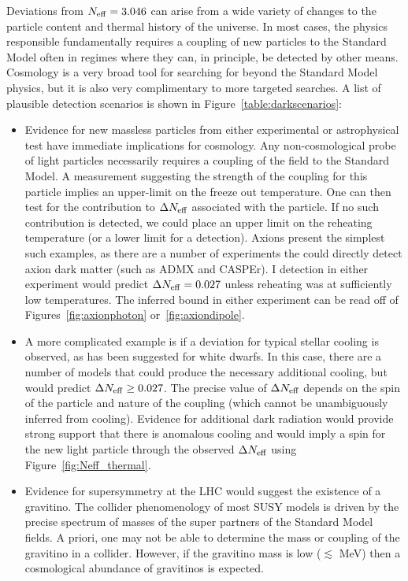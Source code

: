 Deviations from $N_{\rm eff} = 3.046$ can arise from a wide variety of changes to the particle content and thermal history of the universe.  In most cases, the physics responsible fundamentally requires a coupling of new particles to the Standard Model often in regimes where they can, in principle, be detected by other means.  Cosmology is a very broad tool for searching for beyond the Standard Model physics, but it is also very complimentary to more targeted searches.  A list of plausible detection scenarios is shown in Figure~\ref{table:darkscenarios}:
\begin{itemize}
\item Evidence for new massless particles from either experimental or astrophysical test have immediate implications for cosmology.  Any non-cosmological probe of light particles necessarily requires a coupling of the field to the Standard Model.  A measurement suggesting the strength of the coupling for this particle implies an upper-limit on the freeze out temperature.  One can then test for the contribution to $\Delta N_{\rm eff}$ associated with the particle.  If no such contribution is detected, we could place an upper limit on the reheating temperature (or a lower limit for a detection).  Axions present the simplest such examples, as there are a number of experiments the could directly detect axion dark matter (such as ADMX and CASPEr).  I detection in either experiment would predict $\Delta N_{\rm eff} = 0.027$ unless reheating was at sufficiently low temperatures.  The inferred bound in either experiment can be read off of Figures~\ref{fig:axionphoton} or~\ref{fig:axiondipole}.

\item A more complicated example is if a deviation for typical stellar cooling is observed, as has been suggested for white dwarfs.  In this case, there are a number of models that could produce the necessary additional cooling, but would predict $\Delta N_{\rm eff} \geq 0.027$.  The precise value of $\Delta N_{\rm eff}$ depends on the spin of the particle and nature of the coupling (which cannot be unambiguously inferred from cooling).  Evidence for additional dark radiation would provide strong support that there is anomalous cooling and would imply a spin for the new light particle through the observed $\Delta N_{\rm eff}$ using Figure~\ref{fig:Neff_thermal}.

\item Evidence for supersymmetry at the LHC would suggest the existence of a gravitino.  The collider phenomenology of most SUSY models is driven by the precise spectrum of masses of the super partners of the Standard Model fields.  A priori, one may not be able to determine the mass or coupling of the gravitino in a collider.  However, if the gravitino mass is low ($\lesssim$ MeV) then a cosmological abundance of gravitinos is expected.


\end{itemize}
